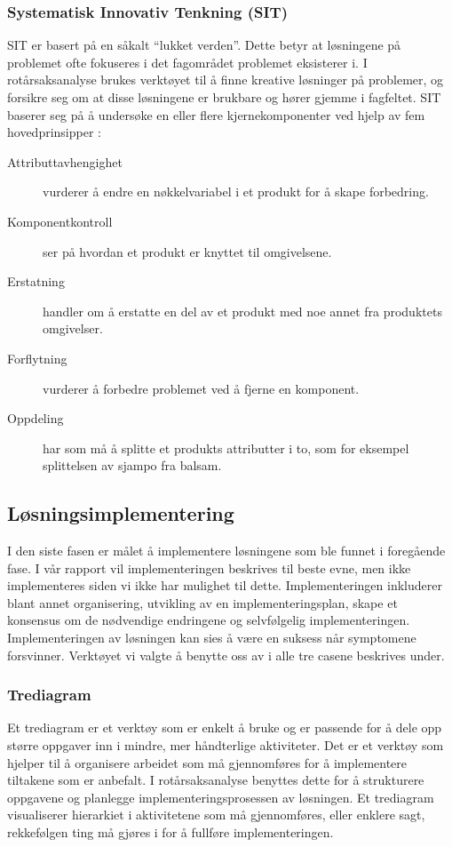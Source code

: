 \subsubsection{Systematisk Innovativ Tenkning (SIT)}
SIT er basert på en såkalt ``lukket verden''. Dette betyr at løsningene på problemet ofte fokuseres i det fagområdet problemet eksisterer i. I rotårsaksanalyse brukes verktøyet til å finne kreative løsninger på problemer, og forsikre seg om at disse løsningene er brukbare og hører gjemme i fagfeltet. SIT baserer seg på å undersøke en eller flere kjernekomponenter ved hjelp av fem hovedprinsipper \cite{RCA}: 

\begin{description}
    \item[Attributtavhengighet] vurderer å endre en nøkkelvariabel i et produkt for å skape forbedring.
    \item[Komponentkontroll] ser på hvordan et produkt er knyttet til omgivelsene.
    \item[Erstatning] handler om å erstatte en del av et produkt med noe annet fra produktets omgivelser.
    \item[Forflytning] vurderer å forbedre problemet ved å fjerne en komponent. 
    \item[Oppdeling] har som må å splitte et produkts attributter i to, som for eksempel splittelsen av sjampo fra balsam.
\end{description}

\subsection{Løsningsimplementering}
I den siste fasen er målet å implementere løsningene som ble funnet i foregående fase. I vår rapport vil implementeringen beskrives til beste evne, men ikke implementeres siden vi ikke har mulighet til dette. Implementeringen inkluderer blant annet organisering, utvikling av en implementeringsplan, skape et konsensus om de nødvendige endringene og selvfølgelig implementeringen. Implementeringen av løsningen kan sies å være en suksess når symptomene forsvinner. Verktøyet vi valgte å benytte oss av i alle tre casene beskrives under. 

\subsubsection{Trediagram}
Et trediagram er et verktøy som er enkelt å bruke og er passende for å dele opp større oppgaver inn i mindre, mer håndterlige aktiviteter. Det er et verktøy som hjelper til å organisere arbeidet som må gjennomføres for å implementere tiltakene som er anbefalt. I rotårsaksanalyse benyttes dette for å strukturere oppgavene og planlegge implementeringsprosessen av løsningen. Et trediagram visualiserer hierarkiet i aktivitetene som må gjennomføres, eller enklere sagt, rekkefølgen ting må gjøres i for å fullføre implementeringen. 